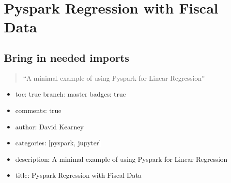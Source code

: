 \documentclass[letterpaper,10pt,english]{sphinxmanual}
\begin{document}
\begin{sphinxVerbatim}[commandchars=\\\{\}]
\end{sphinxVerbatim}

\begin{sphinxVerbatim}[commandchars=\\\{\}]
\end{sphinxVerbatim}


\chapter{Pyspark Regression with Fiscal Data}
\label{\detokenize{2020-08-15-Pyspark-Fiscal-Data-Regression:pyspark-regression-with-fiscal-data}}\label{\detokenize{2020-08-15-Pyspark-Fiscal-Data-Regression::doc}}

\section{Bring in needed imports}
\label{\detokenize{2020-08-15-Pyspark-Fiscal-Data-Regression:bring-in-needed-imports}}\begin{quote}

“A minimal example of using Pyspark for Linear Regression”
\end{quote}
\begin{itemize}
\item {} 
toc: true\sphinxhyphen{} branch: master\sphinxhyphen{} badges: true

\item {} 
comments: true

\item {} 
author: David Kearney

\item {} 
categories: {[}pyspark, jupyter{]}

\item {} 
description: A minimal example of using Pyspark for Linear Regression

\item {} 
title: Pyspark Regression with Fiscal Data

\end{itemize}
\end{document}
